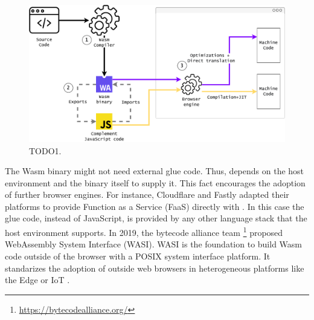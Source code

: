 \begin{figure}[h]
    \centering
    \includegraphics[width=\linewidth]{diagrams/wasm_workflow.pdf}
    \caption{TODO1.}
    \label{diagrams:sota:wasm}
\end{figure}

The Wasm binary might not need external glue code. Thus, depends on the host environment and the binary itself to supply it. This fact encourages the adoption of \wasm further browser engines. For instance, Cloudflare and Fastly adapted their platforms to provide Function as a Service (FaaS) directly with \wasm. In this case the glue code, instead of JavaScript, is provided by any other language stack that the host environment supports.
In 2019, the bytecode alliance team \footnote{\url{https://bytecodealliance.org/}} proposed WebAssembly System Interface (WASI). WASI is the foundation to build Wasm code outside of the browser with a POSIX system interface platform. It standarizes the adoption of \wasm outside web browsers \cite{bryant2020webassembly} in heterogeneous platforms like the Edge or IoT \cite{Narayan2021Swivel,Sledge}. 




